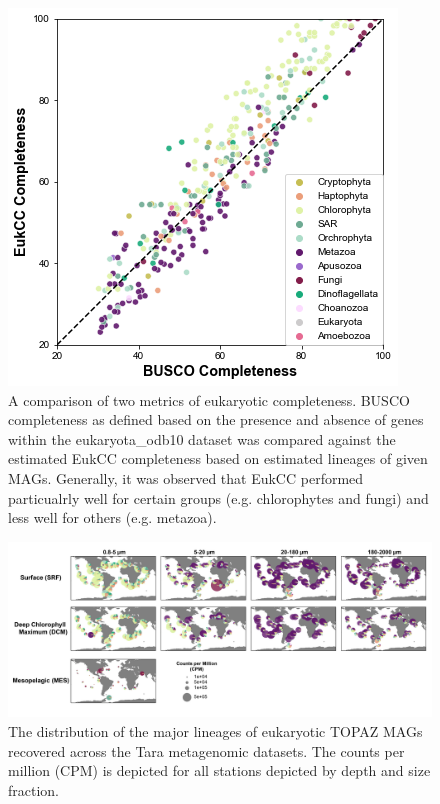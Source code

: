 \documentclass[12pt]{article}
\numberwithin{equation}{section}
\begin{document}
\begin{figure}
    \centering
    \includegraphics[width=0.8\columnwidth]{si-figures/HQ_BUSCO-EukCC-comp.png}
    \caption{A comparison of two metrics of eukaryotic completeness. BUSCO completeness as defined based on the presence and absence of genes within the eukaryota\_odb10 dataset was compared against the estimated EukCC completeness based on estimated lineages of given MAGs. Generally, it was observed that EukCC performed particualrly well for certain groups (e.g. chlorophytes and fungi) and less well for others (e.g. metazoa).}
    \label{fig:eukcc}
\end{figure}


\begin{landscape}
\begin{figure}
    \centering
    \includegraphics[width=0.95\columnwidth]{si-figures/Distribution-Map-Taxonomy-01.png}
    \caption{The distribution of the major lineages of eukaryotic TOPAZ MAGs recovered across the Tara metagenomic datasets. The counts per million (CPM) is depicted for all stations depicted by depth and size fraction.  }
    \label{fig:map}
\end{figure}
\end{landscape}
\end{document}
